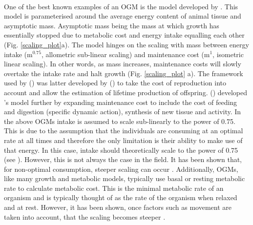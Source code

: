 \documentclass[a4paper, 11pt, hidelinks]{article} %
\begin{document}
	\\
	One of the best known examples of an OGM is the model developed by \cite{West2001}.  This model is parameterised around the average energy content of animal tissue and asymptotic mass.  Asymptotic mass being the mass at which growth has essentially stopped due to metabolic cost and energy intake equalling each other (Fig. \ref{scaling_plot}a). The model hinges on the scaling with mass between energy intake (m$^{0.75}$, allometric sub-linear scaling) and maintenance cost (m$^1$, isometric linear scaling).  In other words, as mass increases, maintenance costs will slowly overtake the intake rate and halt growth (Fig. \ref{scaling_plot} a).  	
	The framework used by \citeauthor{West2001} (\citeyear{West2001}) was latter developed by \citeauthor{Charnov2001} (\citeyear{Charnov2001}) to take the cost of reproduction into account and allow the estimation of lifetime production of offspring.  \citeauthor{Hou2008} (\citeyear{Hou2008})  developed \citeauthor{West2001}'s model further by expanding maintenance cost to include the cost of feeding and digestion (specific dynamic action), synthesis of new tissue and activity.
	In the above OGMs intake is assumed to scale sub-linearly to the power of 0.75.  This is due to the assumption that the individuals are consuming at an optimal rate at all times and therefore the only limitation is their ability to make use of that energy.  In this case, intake should theoretically scale to the power of 0.75 (see \cite{West1997}).  However, this is not always the case in the field.  It has been shown that, for non-optimal consumption, steeper scaling can occur \parencite{Pawar2012, Peters1983}. Additionally, OGMs, like many growth and metabolic models, typically use basal or resting metabolic rate to calculate metabolic cost.  This is the minimal metabolic rate of an organism and is typically thought of as the rate of the organism when relaxed and at rest.  However, it has been shown, once factors such as movement are taken into account, that the scaling becomes steeper \parencite{Weibel2004}.
\end{document}
